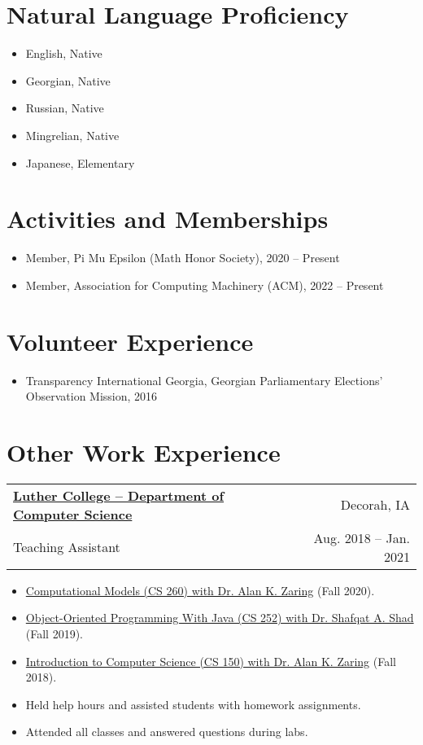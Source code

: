 \documentclass{article}
\makeatletter
\newcommand{\entry}[4]{
    \vspace{-1pt}
    \item
    \begin{tabular*}{0.98\textwidth}[t]{l@{\extracolsep{\fill}}r}
        \textbf{#1} & #2\\
        \small#3 & \small #4\\
    \end{tabular*}\vspace{-4pt}
}
\newcommand{\entriesbegin}{\begin{itemize}[leftmargin=*]}
\newcommand{\entriesend}{\end{itemize}}
\newcommand{\entryitemsstart}{\begin{itemize}[label=\(\circ\)]}
\newcommand{\entryitemsend}{\end{itemize}\vspace{-4pt}}
\newcommand{\entryitem}[1]{\item\small{#1}}
\newcommand{\entrysubitem}[1]{\item[\(\circ\)]\small{#1}\vspace{-4pt}}
\makeatother
\begin{document}
\section{Natural Language Proficiency}

\entriesbegin
\entrysubitem{English, Native}
\entrysubitem{Georgian, Native}
\entrysubitem{Russian, Native}
\entrysubitem{Mingrelian, Native}
\entrysubitem{Japanese, Elementary}
\entriesend



\section{Activities and Memberships}

\entriesbegin
\entrysubitem{Member, Pi Mu Epsilon (Math Honor Society), 2020 -- Present}
\entrysubitem{Member, Association for Computing Machinery (ACM), 2022 -- Present}
\entriesend



\section{Volunteer Experience}

\entriesbegin
\entrysubitem{Transparency International Georgia, Georgian Parliamentary Elections' Observation Mission, 2016}
\entriesend



\clearpage

\section{Other Work Experience}

\entry{\href{https://www.luther.edu/}{Luther College -- Department of Computer Science}}{Decorah, IA}{Teaching Assistant}{Aug. 2018 -- Jan. 2021}
\entryitemsstart
    \entryitem{\href{https://www.luther.edu/catalog/curriculum/computer-science/}{Computational Models (CS 260) with Dr. Alan K. Zaring} (Fall 2020).}
    \entryitem{\href{https://www.luther.edu/catalog/curriculum/computer-science/}{Object-Oriented Programming With Java (CS 252) with Dr. Shafqat A. Shad} (Fall 2019).}
    \entryitem{\href{https://www.luther.edu/catalog/curriculum/computer-science/}{Introduction to Computer Science (CS 150) with Dr. Alan K. Zaring} (Fall 2018).}
    \entryitem{Held help hours and assisted students with homework assignments.}
    \entryitem{Attended all classes and answered questions during labs.}
\entryitemsend
\end{document}
